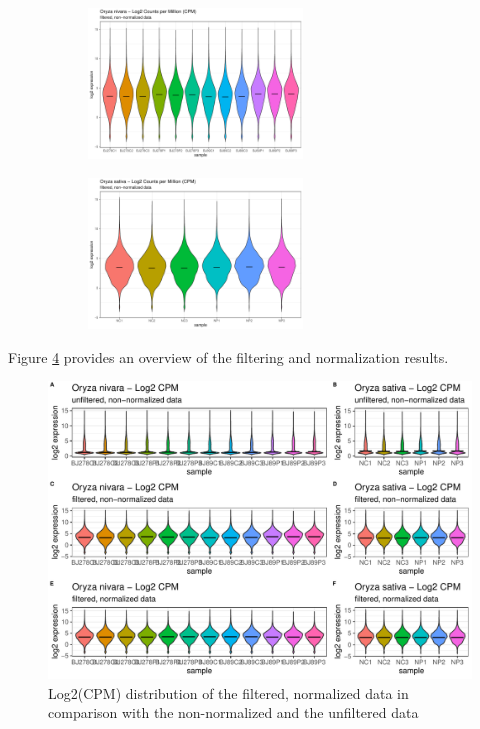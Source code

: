 \begin{figure}[htbp]
    \caption{Log2(CPM) distribution of the filtered, normalized data}
    \label{fig:2.4-Log2CPM-flt-norm}
    \begin{subfigure}[t]{0.64\linewidth}
        \label{fig:2.4-Log2CPM-flt-norm-Oryza_nivara}
        \includegraphics[width=\textwidth, height=4cm]{../../results/plots-and-tables/2.3-Log2CPM-flt-notnorm-Oryza_nivara}
    \end{subfigure}
    \begin{subfigure}[t]{0.32\linewidth}
        \label{fig:2.4-Log2CPM-flt-norm-Oryza_sativa}
        \includegraphics[width=\textwidth, height=4cm]{../../results/plots-and-tables/2.3-Log2CPM-flt-notnorm-Oryza_sativa}
    \end{subfigure}
\end{figure}

Figure \ref{fig:2.5-Log2CPM-Overview} provides an overview of the filtering and normalization results.

\begin{figure}[htbp]
    \caption{Log2(CPM) distribution of the filtered, normalized data in comparison with the non-normalized and the unfiltered data}
    \label{fig:2.5-Log2CPM-Overview}
    \includegraphics[width=\textwidth]{../../results/plots-and-tables/2.5-Log2CPM-Overview}
\end{figure}

